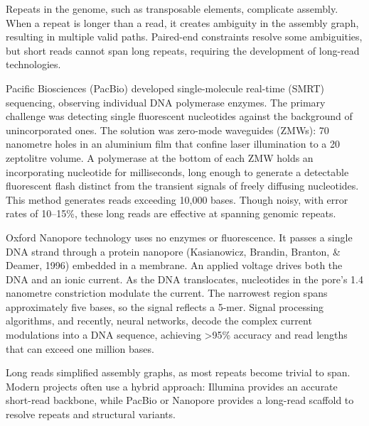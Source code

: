 Repeats in the genome, such as transposable elements, complicate assembly. When a repeat is longer than a read, it creates ambiguity in the assembly graph, resulting in multiple valid paths. Paired-end constraints resolve some ambiguities, but short reads cannot span long repeats, requiring the development of long-read technologies.

Pacific Biosciences (PacBio) developed single-molecule real-time (SMRT) sequencing, observing individual DNA polymerase enzymes. The primary challenge was detecting single fluorescent nucleotides against the background of unincorporated ones. The solution was zero-mode waveguides (ZMWs): 70 nanometre holes in an aluminium film that confine laser illumination to a 20 zeptolitre volume. A polymerase at the bottom of each ZMW holds an incorporating nucleotide for milliseconds, long enough to generate a detectable fluorescent flash distinct from the transient signals of freely diffusing nucleotides. This method generates reads exceeding 10,000 bases. Though noisy, with error rates of 10–15\%, these long reads are effective at spanning genomic repeats.

Oxford Nanopore technology uses no enzymes or fluorescence. It passes a single DNA strand through a protein nanopore (Kasianowicz, Brandin, Branton, \& Deamer, 1996) embedded in a membrane. An applied voltage drives both the DNA and an ionic current. As the DNA translocates, nucleotides in the pore's 1.4 nanometre constriction modulate the current. The narrowest region spans approximately five bases, so the signal reflects a 5-mer. Signal processing algorithms, and recently, neural networks, decode the complex current modulations into a DNA sequence, achieving >95\% accuracy and read lengths that can exceed one million bases.

Long reads simplified assembly graphs, as most repeats become trivial to span. Modern projects often use a hybrid approach: Illumina provides an accurate short-read backbone, while PacBio or Nanopore provides a long-read scaffold to resolve repeats and structural variants.

\newpage

